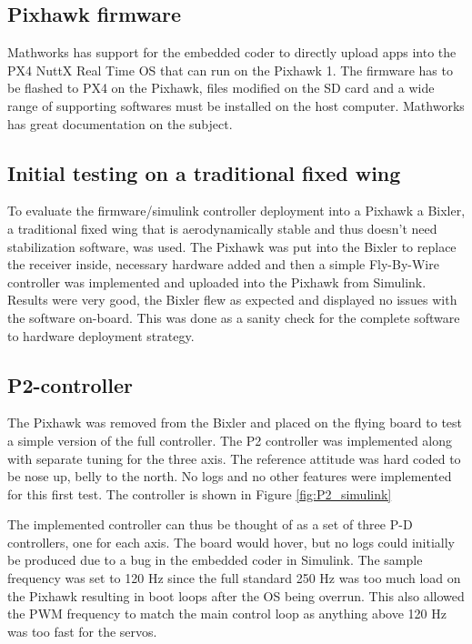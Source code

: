 \documentclass{article}
\begin{document}

\subsection{Pixhawk firmware}
Mathworks has support for the embedded coder to directly upload apps into the PX4 NuttX Real Time OS that can run on the Pixhawk 1.
The firmware has to be flashed to PX4 on the Pixhawk, files modified on the SD card and a wide range of supporting softwares must be installed on the host computer.
Mathworks has great documentation on the subject.\cite{MathworksPX4}

\subsection{Initial testing on a traditional fixed wing}
To evaluate the firmware/simulink controller deployment into a Pixhawk a Bixler, a traditional fixed wing that is aerodynamically stable and thus doesn't need stabilization software, was used.
The Pixhawk was put into the Bixler to replace the receiver inside, necessary hardware added and then a simple Fly-By-Wire controller was implemented and uploaded into the Pixhawk from Simulink.
Results were very good, the Bixler flew as expected and displayed no issues with the software on-board.
This was done as a sanity check for the complete software to hardware deployment strategy.


\subsection{P2-controller}
The Pixhawk was removed from the Bixler and placed on the flying board to test a simple version of the full controller.
The P2 controller \cite{P2} was implemented along with separate tuning for the three axis.
The reference attitude was hard coded to be nose up, belly to the north.
No logs and no other features were implemented for this first test.
The controller is shown in Figure \ref{fig:P2_simulink}

The implemented controller can thus be thought of as a set of three P-D controllers, one for each axis.
The board would hover, but no logs could initially be produced due to a bug in the embedded coder in Simulink.
The sample frequency was set to 120 Hz since the full standard 250 Hz was too much load on the Pixhawk resulting in boot loops after the OS being overrun.
This also allowed the PWM frequency to match the main control loop as anything above 120 Hz was too fast for the servos.
\end{document}
